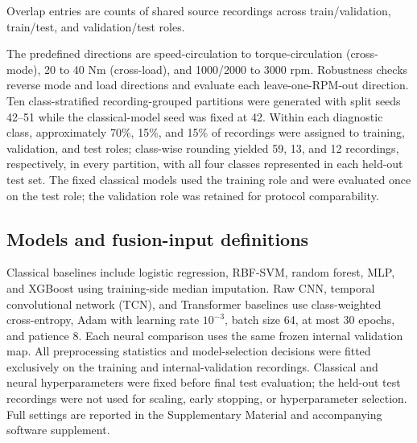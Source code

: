 \documentclass[11pt]{article}
\begin{document}
\begin{table}[H]
\centering
\caption{Frozen recording-grouped neural evaluation roles.}
\label{tab:splits}
\small
{}
\vspace{0.3em}\parbox{\textwidth}{\footnotesize Overlap entries are counts of shared source recordings across train/validation, train/test, and validation/test roles.}
\end{table}


The predefined directions are speed-circulation to torque-circulation (cross-mode), 20 to 40 Nm (cross-load), and 1000/2000 to 3000 rpm. Robustness checks reverse mode and load directions and evaluate each leave-one-RPM-out direction. Ten class-stratified recording-grouped partitions were generated with split seeds 42--51 while the classical-model seed was fixed at 42. Within each diagnostic class, approximately 70\%, 15\%, and 15\% of recordings were assigned to training, validation, and test roles; class-wise rounding yielded 59, 13, and 12 recordings, respectively, in every partition, with all four classes represented in each held-out test set. The fixed classical models used the training role and were evaluated once on the test role; the validation role was retained for protocol comparability.

\subsection{Models and fusion-input definitions}
Classical baselines include logistic regression, RBF-SVM, random forest, MLP, and XGBoost using training-side median imputation. Raw CNN, temporal convolutional network (TCN), and Transformer baselines use class-weighted cross-entropy, Adam with learning rate $10^{-3}$, batch size 64, at most 30 epochs, and patience 8. Each neural comparison uses the same frozen internal validation map. All preprocessing statistics and model-selection decisions were fitted exclusively on the training and internal-validation recordings. Classical and neural hyperparameters were fixed before final test evaluation; the held-out test recordings were not used for scaling, early stopping, or hyperparameter selection. Full settings are reported in the Supplementary Material and accompanying software supplement.
\end{document}
